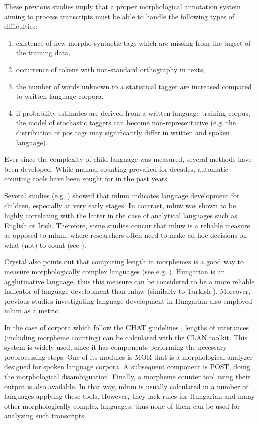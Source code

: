 These previous studies imply that a proper morphological annotation system aiming to process transcripts must be able to handle the following types of difficulties:
\begin{enumerate}
 \item existence of new morpho-syntactic tags which are missing from the tagset of the training data,
 \item occurrence of tokens with non-standard orthography in texts,
 \item the number of words unknown to a statistical tagger are increased compared to written language corpora,
 \item if probability estimates are derived from a written language training corpus, the model of stochastic taggers can become non-representative (e.g. the distribution of \acrshort{pos} tags may significantly differ in written and spoken language).
\end{enumerate}

Ever since the complexity of child language was measured, several methods have been developed. While manual counting prevailed for decades, automatic counting tools have been sought for in the past years.

Several studies (e.g. \cite{Brown1973}) showed that \acrshort{mlum} indicates language development for children, especially at very early stages. 
In contrast, \gls{mluw} was shown to be highly correlating \cite{Hickey1991,Parker2005} with the latter in the case of analytical languages such as English or Irish. 
Therefore, some studies concur that \acrshort{mluw} is a reliable measure as opposed to \acrshort{mlum}, where researchers often need to make ad hoc decisions on what (not) to count (see \cite{Crystal1974}). 

Crystal also points out \cite{Crystal1974} that computing length in morphemes is a good way to measure morphologically complex languages (see e.g. \cite{Bowerman1973}). 
Hungarian is an agglutinative language, thus this measure can be considered to be a more reliable indicator of language development  than \acrshort{mluw} (similarly to Turkish \cite{saygin2010}). 
Moreover, previous studies investigating language development in Hungarian \cite{Reger1990,Weber2011} also employed \acrshort{mlum} as a metric.

In the case of corpora which follow the CHAT guidelines \cite{macwhinney1991childes}, lengths of utterances (including morpheme counting) can be calculated with the CLAN \cite{MacWhinney1992} toolkit. 
This system is widely used, since it has components performing the necessary preprocessing steps. 
One of its modules is MOR that is a morphological analyzer designed for spoken language corpora. 
A subsequent component is POST, doing the morphological disambiguation. 
Finally, a morpheme counter tool using their output is also available. 
In that way, \acrshort{mlum} is usually calculated in a number of languages applying these tools.
However, they lack rules for Hungarian and many other morphologically complex languages, thus none of them can be used for analyzing such transcripts.

